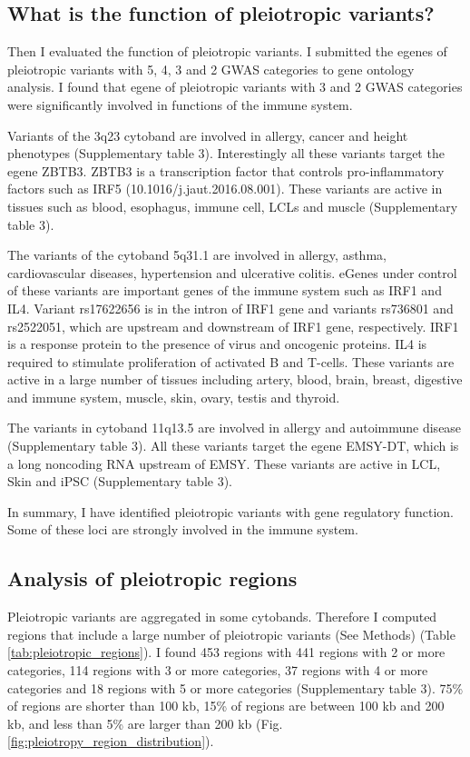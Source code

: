 \subsection*{What is the function of pleiotropic variants?}

Then I evaluated the function of pleiotropic variants.
%
I submitted the egenes of pleiotropic variants with 5, 4, 3 and 2 GWAS categories to gene ontology analysis.
%
I found that egene of pleiotropic variants with 3 and 2 GWAS categories were significantly involved in functions of the immune system.

Variants of the 3q23 cytoband are involved in allergy, cancer and height phenotypes (Supplementary table 3).
%
Interestingly all these variants target the egene ZBTB3.
%
ZBTB3 is a transcription factor that controls pro-inflammatory factors such as IRF5 (10.1016/j.jaut.2016.08.001).
%
These variants are active in tissues such as blood, esophagus, immune cell, LCLs and muscle (Supplementary table 3).

The variants of the cytoband 5q31.1 are involved in allergy, asthma, cardiovascular diseases, hypertension and ulcerative colitis.
%
eGenes under control of these variants are important genes of the immune system such as IRF1 and IL4.
%
Variant rs17622656 is in the intron of IRF1 gene and variants rs736801 and rs2522051, which are upstream and downstream of IRF1 gene, respectively.
%
IRF1 is a response protein to the presence of virus and oncogenic proteins.
%
IL4 is required to stimulate proliferation of activated B and T-cells.
%
These variants are active in a large number of tissues including artery, blood, brain, breast, digestive and immune system, muscle, skin, ovary, testis and thyroid.

The variants in cytoband 11q13.5 are involved in allergy and autoimmune disease (Supplementary table 3).
%
All these variants target the egene EMSY-DT, which is a long noncoding RNA upstream of EMSY.
%
These variants are active in LCL, Skin and iPSC (Supplementary table 3).

In summary, I have identified pleiotropic variants with gene regulatory function.
%
Some of these loci are strongly involved in the immune system.

\subsection*{Analysis of pleiotropic regions}

Pleiotropic variants are aggregated in some cytobands.
%
Therefore I computed regions that include a large number of pleiotropic variants (See Methods) (Table \ref{tab:pleiotropic_regions}).
%
I found 453 regions with 441 regions with 2 or more categories, 114 regions with 3 or more categories, 37 regions with 4 or more categories and 18 regions with 5 or more categories (Supplementary table 3).
%
75\% of regions are shorter than 100 kb, 15\% of regions are between 100 kb and 200 kb, and less than 5\% are larger than 200 kb (Fig. \ref{fig:pleiotropy_region_distribution}).


